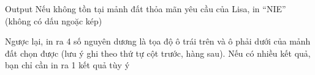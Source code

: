 Output
Nếu không tồn tại mảnh đất thỏa mãn yêu cầu của Lisa, in “NIE” (không có dấu ngoặc kép)  

   Ngược lại, in ra 4 số nguyên dương là tọa độ ô trái trên và ô phải dưới của mảnh đất chọn được (lưu ý ghi theo thứ tự cột trước, hàng sau). Nếu có nhiều kết quả, bạn chỉ cần in ra 1 kết quả tùy ý